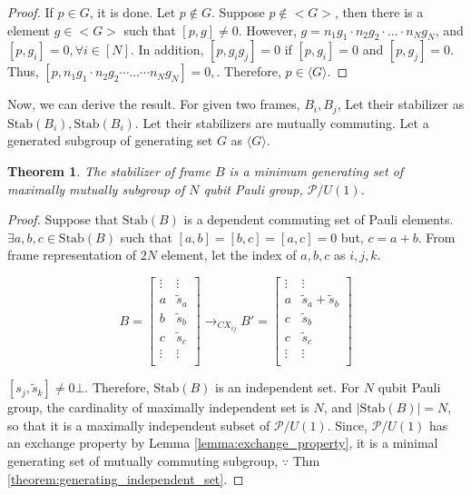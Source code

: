 \documentclass[a4paper,12pt]{article}
\newtheorem{theorem}{Theorem}
\begin{document}
\begin{proof}

If $p \in G$, it is done. Let $p \notin G$.
Suppose $p \notin <G>$, then there is a element $g\in <G>$ such that
$[p, g] \neq 0$. However, $g = n_1 g_1 \cdot n_2 g_2 \cdot \dots \cdot n_N g_N$, and 
$[p, g_i] = 0, \forall i \in [N]$.
In addition, $[p, g_i g_j] =0$ if $[p, g_i] =0$ and $[p, g_j]=0$.
Thus, $[p, n_1 g_1 \cdot n_2 g_2 \cdots \dots \cdots n_N g_N] =0, \!$.
Therefore, $p \in \langle G \rangle$.

\end{proof}

Now, we can derive the result. For given two frames, $B_i, B_j$, 
Let their stabilizer as $\mbox{Stab}(B_i), \mbox{Stab}(B_i)$.
Let their stabilizers are mutually commuting.
Let a generated subgroup of generating set $G$ as $\langle G \rangle$.

\begin{theorem}
    The stabilizer of frame $B$ is a minimum generating set of maximally mutually subgroup of $N$ qubit Pauli group, $\mathcal{P}/U(1)$.
\end{theorem}
\begin{proof}
    Suppose that $\mbox{Stab}(B)$ is a dependent commuting set of Pauli elements.
    $\exists a, b, c \in \mbox{Stab}(B)$ such that $[a,b] = [b,c] = [a,c] = 0$ but, $c = a+b$.
    From frame representation of $2N$ element, let the index of $a, b, c$ as $i, j, k$.

    \begin{equation*}
        B = \begin{bmatrix}
            \vdots & \vdots\\
            a & \tilde{s}_a\\
            b & \tilde{s}_b\\
            c & \tilde{s}_c\\
            \vdots & \vdots\\
        \end{bmatrix}
        \rightarrow_{CX _{ij}}
        B' = \begin{bmatrix}
            \vdots & \vdots\\
            a & \tilde{s}_a + \tilde{s}_b\\
            c & \tilde{s}_b\\
            c & \tilde{s}_c\\
            \vdots & \vdots\\
        \end{bmatrix}
    \end{equation*}

    $[s_j, \tilde{s}_k] \neq 0 \bot$. Therefore, $\mbox{Stab}(B)$ is an independent set.
    For $N$ qubit Pauli group, the cardinality of maximally independent set is $N$,
    and $|\mbox{Stab}(B)|=N$, so that it is a maximally independent subset of $\mathcal{P}/U(1)$.
    Since, $\mathcal{P}/U(1)$ has an exchange property by Lemma \ref{lemma:exchange_property}, it is a minimal generating set of mutually commuting subgroup, $\because $ Thm \ref{theorem:generating_independent_set}.
\end{proof}
\end{document}
